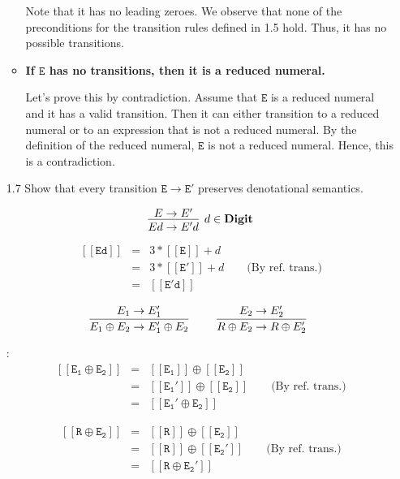 \documentclass[a4paper,10pt]{article}
\newcommand{\E}{\mathtt{E}}
\newcommand{\Digit}{\mathbf{Digit}}
\newcommand{\denot}[1]{\mathtt{[[{#1}]]}}
\newcommand{\question}[1]
{\color{DarkBlue}#1 \color{Black} \newline}
\begin{document}
\begin{enumerate}
\begin{itemize}
	Note that it has no leading zeroes. We observe that none of the preconditions
	for the transition rules defined in 1.5 hold. Thus, 
	it has no possible transitions.
	
	\item {\textbf{If $\E$ has no transitions, then it is a reduced numeral.}}
	
	Let's prove this by contradiction. Assume that $\E$ is a reduced numeral and it
	has a valid transition.
	Then it can either transition to a reduced numeral or to an expression 
	that is not a reduced numeral. By the definition of	the reduced numeral, 
	$\E$ is not a reduced numeral. Hence, this is a contradiction.

\end{itemize}

\question{
\item[1.7] Show that every transition $\E \to \E'$ preserves denotational semantics.
}

\[
\infer[d \in \Digit]
  {Ed \rightarrow E'd}
  {E \rightarrow E'}
\]

\proof
\begin{eqnarray*}
\denot{Ed}  
            & = &  3 * \denot{E} + d  \\
            & = &  3 * \denot{E'} + d \qquad \text{(By ref. trans.)} \\ 
            & = & \denot{E'd} 
\end{eqnarray*}

\[
\infer[]
  {E_{1} \oplus E_{2} \rightarrow E_{1}' \oplus E_{2}}
  {E_{1} \rightarrow E_{1}'} \qquad
\infer[]
  {R \oplus E_{2} \rightarrow R \oplus E_{2}'}
  {E_{2} \rightarrow E_{2}'}
\]

\proof:
\begin{eqnarray*}
\denot{E_{1} \oplus E_{2}}  
            & = &  \denot{E_{1}} \oplus \denot{E_{2}} \\
            & = &  \denot{E_{1}'} \oplus \denot{E_{2}}  
            \qquad \text{(By ref. trans.)}
            \\ 
            & = & \denot{E_{1}' \oplus E_{2}} 
\end{eqnarray*}

\begin{eqnarray*}
\denot{R \oplus E_{2}}  
            & = &  \denot{R} \oplus \denot{E_{2}} \\
            & = &  \denot{R} \oplus \denot{E_{2}'}  
            \qquad \text{(By ref. trans.)} \\
            & = & \denot{{R} \oplus E_{2}'} 
\end{eqnarray*}


\end{enumerate}
\end{document}
